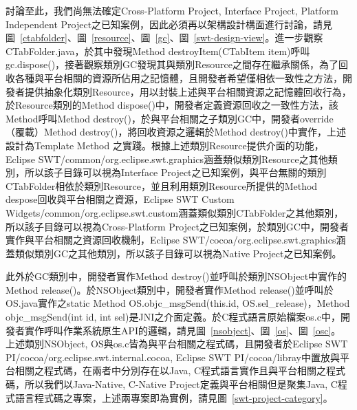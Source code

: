 討論至此，我們尚無法確定Cross-Platform Project, Interface Project, Platform Independent Project之已知案例，因此必須再以架構設計構面進行討論，請見圖~\ref{ctabfolder}、圖~\ref{resource}、圖~\ref{gc}、圖~\ref{swt-design-view}。進一步觀察CTabFolder.java，於其中發現Method destroyItem(CTabItem item)呼叫gc.dispose()，接著觀察類別GC發現其與類別Resource之間存在繼承關係，為了回收各種與平台相關的資源所佔用之記憶體，且開發者希望僅相依一致性之方法，開發者提供抽象化類別Resource，用以封裝上述與平台相關資源之記憶體回收行為，於Resource類別的Method dispose()中，開發者定義資源回收之一致性方法，該Method呼叫Method destroy()，於與平台相關之子類別GC中，開發者override（覆載）Method destroy()，將回收資源之邏輯於Method destroy()中實作，上述設計為Template Method 之實踐\cite{gofdesignpattern}。根據上述類別Resource提供介面的功能，Eclipse SWT/common/org.eclipse.swt.graphics涵蓋類似類別Resource之其他類別，所以該子目錄可以視為Interface Project之已知案例，與平台無關的類別CTabFolder相依於類別Resource，並且利用類別Resource所提供的Method despose回收與平台相關之資源，Eclipse SWT Custom Widgets/common/org.eclipse.swt.custom涵蓋類似類別CTabFolder之其他類別，所以該子目錄可以視為Cross-Platform Project之已知案例，於類別GC中，開發者實作與平台相關之資源回收機制，Eclipse SWT/cocoa/org.eclipse.swt.graphics涵蓋類似類別GC之其他類別，所以該子目錄可以視為Native Project之已知案例。

此外於GC類別中，開發者實作Method destroy()並呼叫於類別NSObject中實作的Method release()。於NSObject類別中，開發者實作Method release()並呼叫於OS.java實作之static Method OS.objc\_msgSend(this.id, OS.sel\_release)，Method objc\_msgSend(int id, int sel)是JNI之介面定義。於C程式語言原始檔案os.c中，開發者實作呼叫作業系統原生API的邏輯，請見圖~\ref{nsobject}、圖~\ref{os}、圖~\ref{osc}。
上述類別NSObject, OS與os.c皆為與平台相關之程式碼，且開發者於Eclipse SWT PI/cocoa/org.eclipse.swt.internal.cocoa, Eclipse SWT PI/cocoa/libray中置放與平台相關之程式碼，在兩者中分別存在以Java, C程式語言實作且與平台相關之程式碼，所以我們以Java-Native, C-Native Project定義與平台相關但是聚集Java, C程式語言程式碼之專案，上述兩專案即為實例，請見圖~\ref{swt-project-category}。%


